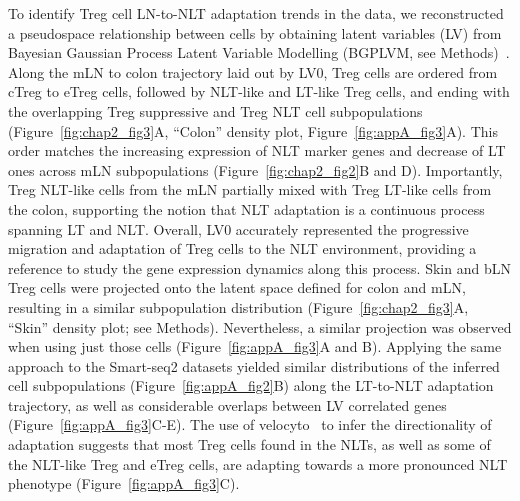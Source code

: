 To identify Treg cell LN-to-NLT adaptation trends in the data, we reconstructed a pseudospace relationship between cells by obtaining latent variables (LV) from Bayesian Gaussian Process Latent Variable Modelling (BGPLVM, see Methods)~\citep{Michalis_K_Titsias2010-na}. Along the mLN to colon trajectory laid out by LV0, Treg cells are ordered from cTreg to eTreg cells, followed by NLT-like and LT-like Treg cells, and ending with the overlapping Treg suppressive and Treg NLT cell subpopulations (Figure~\ref{fig:chap2_fig3}A, “Colon” density plot, Figure~\ref{fig:appA_fig3}A). This order matches the increasing expression of NLT marker genes and decrease of LT ones across mLN subpopulations (Figure~\ref{fig:chap2_fig2}B and D). Importantly, Treg NLT-like cells from the mLN partially mixed with Treg LT-like cells from the colon, supporting the notion that NLT adaptation is a continuous process spanning LT and NLT. Overall, LV0 accurately represented the progressive migration and adaptation of Treg cells to the NLT environment, providing a reference to study the gene expression dynamics along this process. Skin and bLN Treg cells were projected onto the latent space defined for colon and mLN, resulting in a similar subpopulation distribution (Figure~\ref{fig:chap2_fig3}A, “Skin” density plot; see Methods). Nevertheless, a similar projection was observed when using just those cells (Figure~\ref{fig:appA_fig3}A and B). Applying the same approach to the Smart-seq2 datasets yielded similar distributions of the inferred cell subpopulations (Figure~\ref{fig:appA_fig2}B) along the LT-to-NLT adaptation trajectory, as well as considerable overlaps between LV correlated genes (Figure~\ref{fig:appA_fig3}C-E). The use of velocyto~\citep{manno_rna_2018} to infer the directionality of adaptation suggests that most Treg cells found in the NLTs, as well as some of the NLT-like Treg and eTreg cells, are adapting towards a more pronounced NLT phenotype (Figure~\ref{fig:appA_fig3}C).

